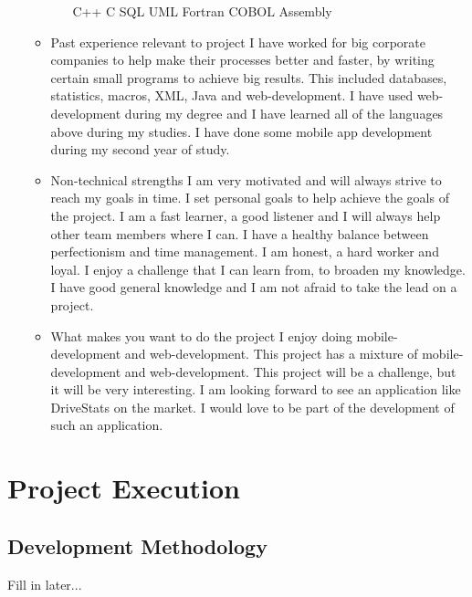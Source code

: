 \documentclass[12pt, oneside]{article}
\begin{document}
\begin{enumerate}
\begin{itemize}
\begin{itemize}
					C++\newline
					C\newline
					SQL\newline
					UML\newline	
					Fortran\newline
					COBOL\newline
					Assembly\newline
				\end{itemize}
			\item Past experience relevant to project\newline
				I have worked for big corporate companies to help make their processes better and faster, by writing 						certain small programs to achieve big results. This included databases, statistics, macros, XML, Java and 						web-development. I have used web-development during my degree and I have learned all of the 							languages above during my studies. I have done some mobile app development during my second year of study.
			\item Non-technical strengths\newline
				I am very motivated and will always strive to reach my goals in time. I set personal goals to help achieve 						the goals of the project. I am a fast learner, a good listener and I will always help other team members 						where I can. I have a healthy balance between perfectionism and time management. I am honest, a hard 						worker and loyal. I enjoy a challenge that I can learn from, to broaden my knowledge. I have good 							general knowledge and I am not afraid to take the lead on a project.
			\item What makes you want to do the project\newline
				I enjoy doing mobile-development and web-development. This project has a mixture of mobile-							development and web-development. This project will be a challenge, but it will be very interesting. I am 						looking forward to see an application like DriveStats on the market. I would love to be part of the 							development of such an application.
		\end{itemize}
	\end{enumerate}
	
\section{Project Execution}
	\subsection{Development Methodology}
		Fill in later...
\end{document}
